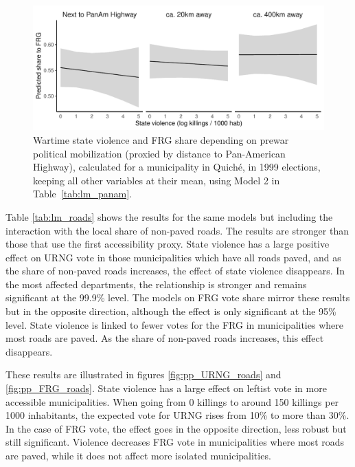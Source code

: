 \documentclass[12pt, notitlepage]{article}
\begin{document}
\begin{figure}[htb!]
  \centering
    \includegraphics[width = .75\textwidth]{img/pp_FRG_panam}

  \caption{Wartime state violence and FRG share depending on prewar political mobilization (proxied by distance to Pan-American Highway), calculated for a municipality in Quiché, in 1999 elections, keeping all other variables at their mean, using Model 2 in Table~\ref{tab:lm_panam}.} \label{fig:pp_FRG_panam}


\end{figure}

Table \ref{tab:lm_roads} shows the results for the same models but including the interaction with the local share of non-paved roads.
The results are stronger than those that use the first accessibility proxy.
State violence has a large positive effect on URNG vote in those municipalities which have all roads paved, and as the share of non-paved roads increases, the effect of state violence disappears.
In the most affected departments, the relationship is stronger and remains significant at the 99.9\% level.
The models on FRG vote share mirror these results but in the opposite direction, although the effect is only significant at the 95\% level.
State violence is linked to fewer votes for the FRG in municipalities where most roads are paved. As the share of non-paved roads increases, this effect disappears.



These results are illustrated in figures \ref{fig:pp_URNG_roads} and \ref{fig:pp_FRG_roads}.
State violence has a large effect on leftist vote in more accessible municipalities.
When going from 0 killings to around 150 killings per 1000 inhabitants, the expected vote for URNG rises from 10\% to more than 30\%.
In the case of FRG vote, the effect goes in the opposite direction, less robust but still significant.
Violence decreases FRG vote in municipalities where most roads are paved, while it does not affect more isolated municipalities.
\end{document}
